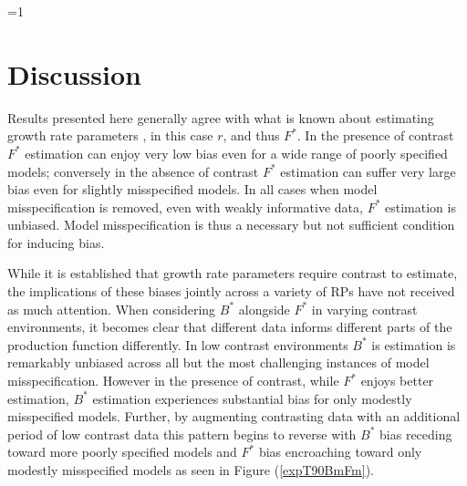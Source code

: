 \documentclass[12pt]{article}
\newcounter{alphasect}
\def\alphainsection{0}
\let\oldsection=\section
\def\section{%
  \ifnum\alphainsection=1%
    \addtocounter{alphasect}{1}
  \fi%
\oldsection}%
\begin{document}
\clearpage
\section{Discussion\label{dis}}

%
Results presented here generally agree with what is known about estimating 
growth rate parameters , 
in this case $r$, and thus $F^*$.  
In the presence of contrast $F^*$ estimation can enjoy very low bias even 
for a wide range of poorly specified models; conversely in the absence of 
contrast $F^*$ estimation can suffer very large bias even for slightly 
misspecified models. In all cases when model misspecification is removed, even 
with weakly informative data, $F^*$ estimation is unbiased.  Model 
misspecification is thus a necessary but not sufficient condition for inducing 
bias. 



While it is established that growth rate parameters require contrast to estimate, 
the implications of these biases jointly across a variety of RPs have not 
received as much attention. 
When considering $B^*$ alongside $F^*$ in varying contrast environments, it 
becomes clear that different data informs different parts of the production 
function differently. In low contrast environments $B^*$ is estimation is 
remarkably unbiased across all but the most challenging instances of model 
misspecification. However in the presence of contrast, while $F^*$ enjoys 
better estimation, $B^*$ estimation experiences substantial bias for only 
modestly misspecified models. Further, by augmenting contrasting data with an 
additional period of low contrast data this pattern begins to reverse with $B^*$ 
bias receding toward more poorly specified models and $F^*$ bias encroaching 
toward only modestly misspecified models as seen in Figure (\ref{expT90BmFm}).   
\end{document}
